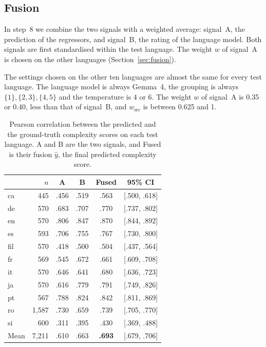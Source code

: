 \documentclass[11pt]{article}
\begin{document}
\subsection{Fusion}
\label{sec:results-fusion}

In step~8 we combine the two signals with a weighted average: signal~A, the prediction of the %
regressors, and signal~B, the rating of the language model. Both signals are first standardised
within the test language. The weight $w$ of signal~A is chosen on the other languages
(Section~\ref{sec:fusion}).

The settings chosen on the other ten languages are almost the same for every test language. The %
language model is always Gemma~4, the grouping is always $\{1\}, \{2, 3\}, \{4, 5\}$ and the
temperature is 4 or 6. The weight $w$ of signal~A is 0.35 or 0.40, less than that of signal~B, and %
$w_{\mathrm{src}}$ is between 0.625 and 1.

\begin{table}[t]
\centering
\small
\setlength{\tabcolsep}{4pt}
\begin{tabular}{lrcccc}
\toprule
 & $n$ & A & B & Fused & 95\% CI \\
\midrule
ca  &   445 & .456 & .519 & .563 & [.500, .618] \\ %
de  &   570 & .683 & .707 & .770 & [.737, .802] \\ %
en  &   570 & .806 & .847 & .870 & [.844, .892] \\ %
es  &   593 & .706 & .755 & .767 & [.730, .800] \\ %
fil &   570 & .418 & .500 & .504 & [.437, .564] \\ %
fr  &   569 & .545 & .672 & .661 & [.609, .708] \\ %
it  &   570 & .646 & .641 & .680 & [.636, .723] \\ %
ja  &   570 & .616 & .779 & .791 & [.749, .826] \\ %
pt  &   567 & .788 & .824 & .842 & [.811, .869] \\ %
ro  & 1{,}587 & .730 & .659 & .739 & [.705, .770] \\ %
si  &   600 & .311 & .395 & .430 & [.369, .488] \\ %
\midrule
Mean & 7{,}211 & .610 & .663 & \textbf{.693} & [.679, .706] \\ %
\bottomrule
\end{tabular}
\caption{Pearson correlation between the predicted and the ground-truth complexity scores on each
test language. A and B are the two signals, and Fused is their fusion $\hat{y}$, the final
predicted complexity score.}
\label{tab:per-language}
\end{table}
\end{document}
